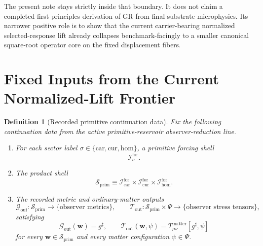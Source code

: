 \documentclass[11pt]{article}
\newcommand{\CompletedMetric}{g^{\sharp}}
\newcommand{\MatterSpace}{\Psi}
\newcommand{\Car}{\mathrm{car}}
\newcommand{\Cur}{\mathrm{cur}}
\newcommand{\Hom}{\mathrm{hom}}
\newcommand{\ForSpace}[1]{\mathcal I_{#1}^{\mathrm{for}}}
\newcommand{\PrimShell}{\mathcal S_{\mathrm{prim}}}
\newcommand{\MetricOut}{\mathscr G_{\mathrm{out}}}
\newcommand{\MatterOut}{\mathscr T_{\mathrm{out}}}
\newtheorem{definition}{Definition}
\begin{document}
The present note stays strictly inside that boundary. It does not claim a completed first-principles derivation of GR from final substrate microphysics. Its narrower positive role is to show that the current carrier-bearing normalized selected-response lift already collapses benchmark-facingly to a smaller canonical square-root operator core on the fixed displacement fibers.

\section{Fixed Inputs from the Current Normalized-Lift Frontier}

\begin{definition}[Recorded primitive continuation data]
\label{def:fixed}
Fix the following continuation data from the active primitive-reservoir observer-reduction line.
\begin{enumerate}
    \item For each sector label \(\sigma\in\{\Car,\Cur,\Hom\}\), a primitive forcing shell
    \[
    \ForSpace{\sigma}.
    \]
    \item The product shell
    \[
    \PrimShell
    \equiv
    \ForSpace{\Car}\times \ForSpace{\Cur}\times \ForSpace{\Hom}.
    \]
    \item The recorded metric and ordinary-matter outputs
    \[
    \MetricOut:\PrimShell\to\{\text{observer metrics}\},
    \qquad
    \MatterOut:\PrimShell\times\MatterSpace\to\{\text{observer stress tensors}\},
    \]
    satisfying
    \begin{equation}
    \MetricOut(\mathbf w)=\CompletedMetric,
    \qquad
    \MatterOut(\mathbf w,\psi)
    =
    T_{\mu\nu}^{\mathrm{matter}}[\CompletedMetric,\psi]
    \label{eq:fixedoutputs}
    \end{equation}
    for every \(\mathbf w\in\PrimShell\) and every matter configuration \(\psi\in\MatterSpace\).
\end{enumerate}
\end{definition}
\end{document}
